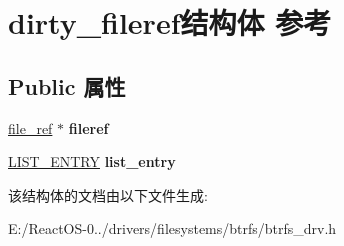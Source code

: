 \hypertarget{structdirty__fileref}{}\section{dirty\+\_\+fileref结构体 参考}
\label{structdirty__fileref}
\subsection*{Public 属性}
\begin{DoxyCompactItemize}
\item 
\mbox{\label{structdirty__fileref_a20c92913d75c9eef704eef3e1c7f9a2d}} 
\hyperlink{struct__file__ref}{file\+\_\+ref} $\ast$ {\bfseries fileref}
\item 
\mbox{\label{structdirty__fileref_a5c3c6af189182ab113d7806acf66570d}} 
\hyperlink{struct___l_i_s_t___e_n_t_r_y}{L\+I\+S\+T\+\_\+\+E\+N\+T\+RY} {\bfseries list\+\_\+entry}
\end{DoxyCompactItemize}


该结构体的文档由以下文件生成\+:\begin{DoxyCompactItemize}
\item 
E\+:/\+React\+O\+S-\/0../drivers/filesystems/btrfs/btrfs\+\_\+drv.\+h\end{DoxyCompactItemize}
